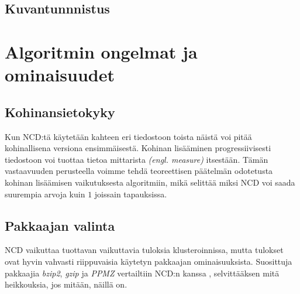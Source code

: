 \documentclass[12pt,finnish,draft]{tktltiki2}
\theoremstyle{definition}
\theoremstyle{remark}
\newcommand{\engl}[1]{\emph{(engl. #1)}}
\begin{document}
  \subsection{Kuvantunnnistus} %
  \label{sub:kuvantunnnistus}


\section{Algoritmin ongelmat ja ominaisuudet} %
\label{sec:algoritmin_ongelmat_ja_ominaisuudet}
  \subsection{Kohinansietokyky} %
  \label{sub:kohinansietokyky}

    Kun NCD:tä käytetään kahteen eri tiedostoon toista näistä voi pitää kohinallisena versiona ensimmäisestä.
    Kohinan lisääminen progressiivisesti tiedostoon voi tuottaa tietoa mittarista \engl{measure} itsestään.
    Tämän vastaavuuden perusteella voimme tehdä teoreettisen päätelmän odotetusta kohinan lisäämisen vaikutuksesta algoritmiin, mikä selittää miksi NCD voi saada suurempia arvoja kuin $1$ joissain tapauksissa. \cite{4167725}


  \subsection{Pakkaajan valinta} %
  \label{sub:pakkaajan_valinta}

      NCD vaikuttaa tuottavan vaikuttavia tuloksia klusteroinnissa, mutta tulokset ovat hyvin vahvasti riippuvaisia käytetyn pakkaajan ominaisuuksista.
      Suosittuja pakkaajia \emph{bzip2}, \emph{gzip} ja \emph{PPMZ} vertailtiin NCD:n kanssa \cite{cebrian2005common}, selvittääksen mitä heikkouksia, jos mitään, näillä on.
\end{document}
